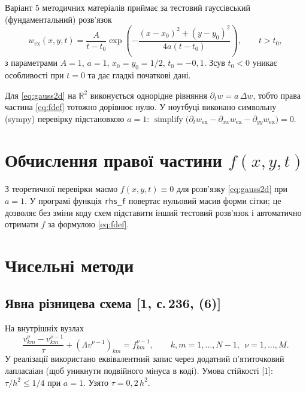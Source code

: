 \documentclass[12pt,a4paper]{article}
\newcommand{\tauh}{\tau}
\newcommand{\La}{\Lambda}
\newcommand{\wex}{w_{\mathrm{ex}}}
\newcommand{\dt}{\partial_t}
\newcommand{\dxx}{\partial_{xx}}
\newcommand{\dyy}{\partial_{yy}}
\begin{document}
Варіант 5 методичних матеріалів приймає за тестовий гауссівський (фундаментальний) розв'язок
\begin{equation}
  \wex(x,y,t) = \frac{A}{t-t_0}\exp\!\left(
    -\frac{(x-x_0)^2 + (y-y_0)^2}{4a(t-t_0)}\right),\qquad t>t_0,\label{eq:gauss2d}
\end{equation}
з параметрами $A=1$, $a=1$, $x_0=y_0=1/2$, $t_0=-0{,}1$. Зсув $t_0<0$ уникає особливості при $t=0$ та дає гладкі початкові дані.

Для \eqref{eq:gauss2d} на $\mathbb{R}^2$ виконується однорідне рівняння $\dt w = a\,\Delta w$, тобто права частина \eqref{eq:fdef} тотожно дорівнює нулю. У ноутбуці виконано символьну (sympy) перевірку підстановкою $a=1$:
$\operatorname{simplify}\bigl(\dt \wex - \dxx \wex - \dyy \wex\bigr) = 0.$

\section{Обчислення правої частини $f(x,y,t)$}

З теоретичної перевірки маємо $f(x,y,t)\equiv 0$ для розв'язку \eqref{eq:gauss2d} при $a=1$. У програмі функція \texttt{rhs\_f} повертає нульовий масив форми сітки; це дозволяє без зміни коду схем підставити інший тестовий розв'язок і автоматично отримати $f$ за формулою \eqref{eq:fdef}.

\section{Чисельні методи}

\subsection{Явна різницева схема [1, с.\,236, (6)]}

На внутрішніх вузлах
\begin{equation}
  \frac{v_{km}^{\nu} - v_{km}^{\nu-1}}{\tauh} + (\La v^{\nu-1})_{km} = f_{km}^{\nu-1},
  \qquad k,m=1,\dots,N-1,\ \ \nu=1,\dots,M. \label{eq:expl}
\end{equation}
У реалізації використано еквівалентний запис через додатний п'ятиточковий лапласаіан (щоб уникнути подвійного мінуса в коді). Умова стійкості [1]: $\tauh/h^2 \le 1/4$ при $a=1$. Узято $\tauh=0{,}2\,h^2$.
\end{document}
